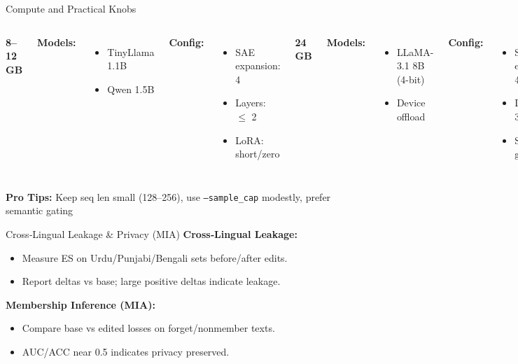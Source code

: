 \documentclass[aspectratio=169]{beamer}
\begin{document}
\begin{frame}{Compute and Practical Knobs}

\begin{columns}[T]

\textcolor{mGreen}{\textbf{8--12 GB}}

\textbf{Models:}
\begin{itemize}
  \item TinyLlama 1.1B
  \item Qwen 1.5B
\end{itemize}

\textbf{Config:}
\begin{itemize}
  \item SAE expansion: 4
  \item Layers: $\leq$  2
  \item LoRA: short/zero
\end{itemize}


\textcolor{mBlue}{\textbf{24 GB}}

\textbf{Models:}
\begin{itemize}
  \item LLaMA-3.1 8B (4-bit)
  \item Device offload
\end{itemize}

\textbf{Config:}
\begin{itemize}
  \item SAE expansion: 4--8
  \item Layers: 2--3
  \item Semantic gating
\end{itemize}

\end{columns}

\vspace{4mm}

\textcolor{mOrange}{\textbf{Pro Tips:}} Keep seq len small (128--256), use \texttt{--sample\_cap} modestly, prefer semantic gating

\end{frame}

\begin{frame}{Cross‑Lingual Leakage & Privacy (MIA)}
\small
\textbf{Cross‑Lingual Leakage:}
\begin{itemize}
  \item Measure ES on Urdu/Punjabi/Bengali sets before/after edits.
  \item Report deltas vs base; large positive deltas indicate leakage.
\end{itemize}
\vspace{2mm}
\textbf{Membership Inference (MIA):}
\begin{itemize}
  \item Compare base vs edited losses on forget/nonmember texts.
  \item AUC/ACC near 0.5 indicates privacy preserved.
\end{itemize}
\end{frame}
\end{document}
